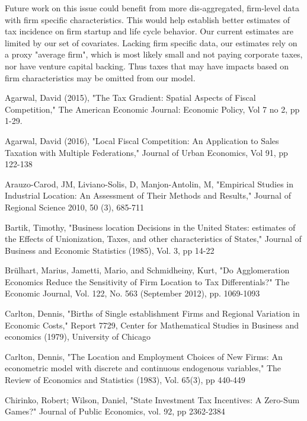 \documentclass[12pt,a4paper]{article}
\renewcommand{\baselinestretch}{2}
\begin{document}
Future work on this issue could benefit from more dis-aggregated, firm-level data with firm specific characteristics. This would help establish better estimates of tax incidence on firm startup and life cycle behavior. Our current estimates are limited by our set of covariates. Lacking firm specific data, our estimates rely on a proxy "average firm", which is most likely small and not paying corporate taxes, nor have venture capital backing. Thus taxes that may have impacts based on firm characteristics may be omitted from our model.

\renewcommand{\baselinestretch}{1.0} 

\newpage
\begin{thebibliography}{99}

Agarwal, David (2015), "The Tax Gradient: Spatial Aspects of Fiscal Competition," The American Economic Journal: Economic Policy, Vol 7 no 2, pp 1-29.

Agarwal, David (2016), "Local Fiscal Competition: An Application to Sales Taxation with Multiple Federations," Journal of Urban Economics, Vol 91, pp 122-138

Arauzo-Carod, JM, Liviano-Solis, D, Manjon-Antolin, M, "Empirical Studies in Industrial Location: An Assessment of Their Methods and Results," Journal of Regional Science 2010, 50 (3), 685-711

Bartik, Timothy, "Business location Decisions in the United States: estimates of the Effects of Unionization, Taxes, and other characteristics of States," Journal of Business and Economic Statistics (1985), Vol. 3, pp 14-22

Brülhart, Marius, Jametti, Mario, and Schmidheiny, Kurt, "Do Agglomeration Economics Reduce the Sensitivity of Firm Location to Tax Differentials?" The Economic Journal, Vol. 122, No. 563 (September 2012), pp. 1069-1093

Carlton, Dennis, "Births of Single establishment Firms and Regional Variation in Economic Costs," Report 7729, Center for Mathematical Studies in Business and economics (1979), University of Chicago

Carlton, Dennis, "The Location and Employment Choices of New Firms: An econometric model with discrete and continuous endogenous variables," The Review of Economics and Statistics (1983), Vol. 65(3), pp 440-449

Chirinko, Robert; Wilson, Daniel, "State Investment Tax Incentives: A Zero-Sum Games?" Journal of Public Economics, vol. 92, pp 2362-2384


\end{thebibliography}
\end{document}
